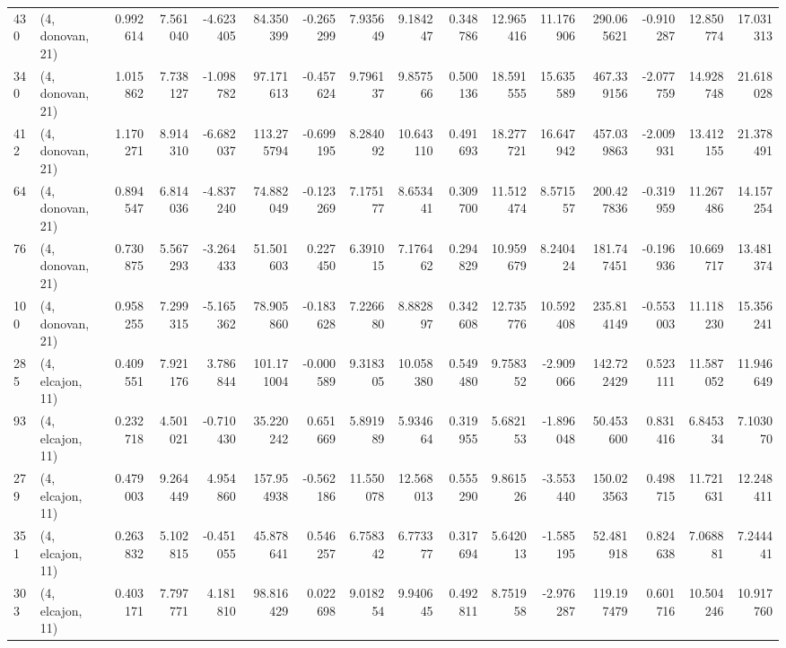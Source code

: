 \begin{tabular}{llrrrrrrrrrrrrrr}
430 &  (4, donovan, 21) &   0.992614 &   7.561040 &  -4.623405 &    84.350399 &  -0.265299 &   7.935649 &   9.184247 &  0.348786 &  12.965416 &  11.176906 &    290.065621 &   -0.910287 &   12.850774 &   17.031313 \\
340 &  (4, donovan, 21) &   1.015862 &   7.738127 &  -1.098782 &    97.171613 &  -0.457624 &   9.796137 &   9.857566 &  0.500136 &  18.591555 &  15.635589 &    467.339156 &   -2.077759 &   14.928748 &   21.618028 \\
412 &  (4, donovan, 21) &   1.170271 &   8.914310 &  -6.682037 &   113.275794 &  -0.699195 &   8.284092 &  10.643110 &  0.491693 &  18.277721 &  16.647942 &    457.039863 &   -2.009931 &   13.412155 &   21.378491 \\
64  &  (4, donovan, 21) &   0.894547 &   6.814036 &  -4.837240 &    74.882049 &  -0.123269 &   7.175177 &   8.653441 &  0.309700 &  11.512474 &   8.571557 &    200.427836 &   -0.319959 &   11.267486 &   14.157254 \\
76  &  (4, donovan, 21) &   0.730875 &   5.567293 &  -3.264433 &    51.501603 &   0.227450 &   6.391015 &   7.176462 &  0.294829 &  10.959679 &   8.240424 &    181.747451 &   -0.196936 &   10.669717 &   13.481374 \\
100 &  (4, donovan, 21) &   0.958255 &   7.299315 &  -5.165362 &    78.905860 &  -0.183628 &   7.226680 &   8.882897 &  0.342608 &  12.735776 &  10.592408 &    235.814149 &   -0.553003 &   11.118230 &   15.356241 \\
285 &  (4, elcajon, 11) &   0.409551 &   7.921176 &   3.786844 &   101.171004 &  -0.000589 &   9.318305 &  10.058380 &  0.549480 &   9.758352 &  -2.909066 &    142.722429 &    0.523111 &   11.587052 &   11.946649 \\
93  &  (4, elcajon, 11) &   0.232718 &   4.501021 &  -0.710430 &    35.220242 &   0.651669 &   5.891989 &   5.934664 &  0.319955 &   5.682153 &  -1.896048 &     50.453600 &    0.831416 &    6.845334 &    7.103070 \\
279 &  (4, elcajon, 11) &   0.479003 &   9.264449 &   4.954860 &   157.954938 &  -0.562186 &  11.550078 &  12.568013 &  0.555290 &   9.861526 &  -3.553440 &    150.023563 &    0.498715 &   11.721631 &   12.248411 \\
351 &  (4, elcajon, 11) &   0.263832 &   5.102815 &  -0.451055 &    45.878641 &   0.546257 &   6.758342 &   6.773377 &  0.317694 &   5.642013 &  -1.585195 &     52.481918 &    0.824638 &    7.068881 &    7.244441 \\
303 &  (4, elcajon, 11) &   0.403171 &   7.797771 &   4.181810 &    98.816429 &   0.022698 &   9.018254 &   9.940645 &  0.492811 &   8.751958 &  -2.976287 &    119.197479 &    0.601716 &   10.504246 &   10.917760 \\

\end{tabular}
